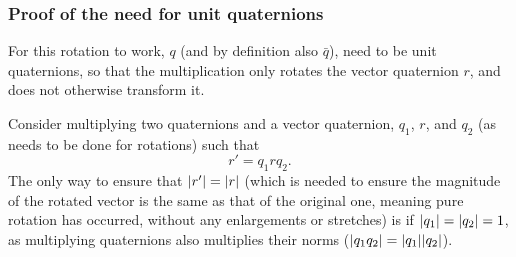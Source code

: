 \documentclass[12pt]{article}
\theoremstyle{definition}
\begin{document}
\subsubsection{Proof of the need for unit quaternions}

For this rotation to work, $q$ (and by definition also $\bar{q}$), need to be unit quaternions, so that the multiplication only rotates the vector quaternion $r$, and does not otherwise transform it.

Consider multiplying two quaternions and a vector quaternion, $q_1$, $r$, and $q_2$ (as needs to be done for rotations) such that
\begin{equation}
    r' = q_1rq_2.
\end{equation}
The only way to ensure that $\abs{r'} = \abs{r}$ (which is needed to ensure the magnitude of the rotated vector is the same as that of the original one, meaning pure rotation has occurred, without any enlargements or stretches) is if $\abs{q_1} = \abs{q_2} = 1$, as multiplying quaternions also multiplies their norms ($\abs{q_1q_2} = \abs{q_1}\abs{q_2}$). \cite{Math431}
\end{document}
